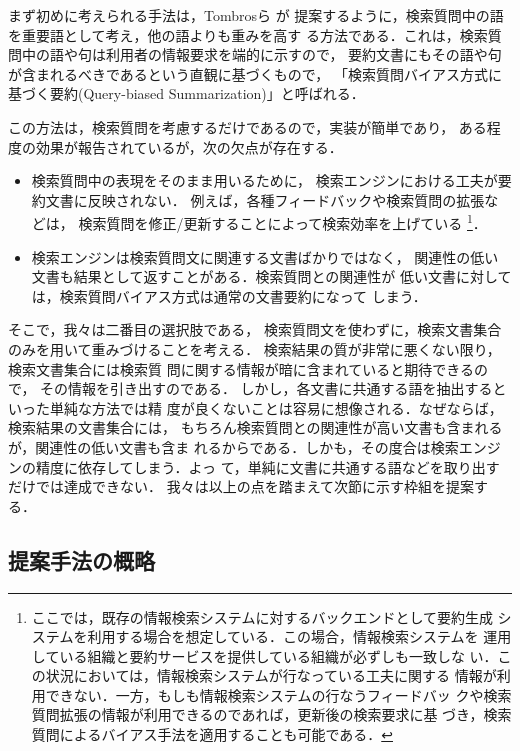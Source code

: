 まず初めに考えられる手法は，Tombrosら
\cite{Tombros:AdvantagesOfQueryBiasedSummariesInInformationRetrieval}が
提案するように，検索質問中の語を重要語として考え，他の語よりも重みを高す
る方法である．これは，検索質問中の語や句は利用者の情報要求を端的に示すので，
要約文書にもその語や句が含まれるべきであるという直観に基づくもので，
「検索質問バイアス方式に基づく要約(Query-biased Summarization)」と呼ばれる．

この方法は，検索質問を考慮するだけであるので，実装が簡単であり，
ある程度の効果が報告されているが，次の欠点が存在する．
\begin{itemize}
 \item 検索質問中の表現をそのまま用いるために，
       検索エンジンにおける工夫が要約文書に反映されない．
       例えば，各種フィードバックや検索質問の拡張などは，
       検索質問を修正/更新することによって検索効率を上げている
       \footnote{
       ここでは，既存の情報検索システムに対するバックエンドとして要約生成
       システムを利用する場合を想定している．この場合，情報検索システムを
       運用している組織と要約サービスを提供している組織が必ずしも一致しな
       い．この状況においては，情報検索システムが行なっている工夫に関する
       情報が利用できない．一方，もしも情報検索システムの行なうフィードバッ
       クや検索質問拡張の情報が利用できるのであれば，更新後の検索要求に基
       づき，検索質問によるバイアス手法を適用することも可能である．
       }．
 \item 検索エンジンは検索質問文に関連する文書ばかりではなく，
       関連性の低い文書も結果として返すことがある．検索質問との関連性が
       低い文書に対しては，検索質問バイアス方式は通常の文書要約になって
       しまう．
\end{itemize}

そこで，我々は二番目の選択肢である，
検索質問文を使わずに，検索文書集合のみを用いて重みづけることを考える．
検索結果の質が非常に悪くない限り，検索文書集合には検索質
問に関する情報が暗に含まれていると期待できるので，
その情報を引き出すのである．
しかし，各文書に共通する語を抽出するといった単純な方法では精
度が良くないことは容易に想像される．なぜならば，検索結果の文書集合には，
もちろん検索質問との関連性が高い文書も含まれるが，関連性の低い文書も含ま
れるからである．しかも，その度合は検索エンジンの精度に依存してしまう．よっ
て，単純に文書に共通する語などを取り出すだけでは達成できない．
我々は以上の点を踏まえて次節に示す枠組を提案する．

\subsection{提案手法の概略}

